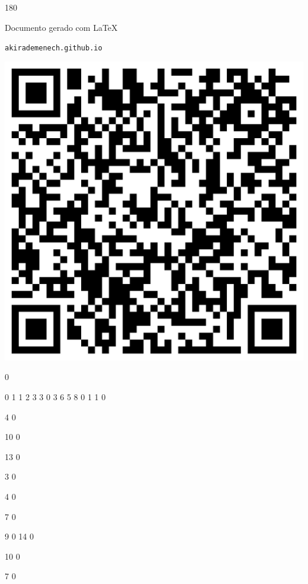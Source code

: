 \documentclass[12pt]{article}
\begin{document}
	\begin{turn}{180}	
		\begin{minipage}{\textwidth}		  
		  Documento gerado com \LaTeX			
		  
		  \texttt{akirademenech.github.io}

		  \includegraphics[height=0.3\textheight]{2e-2.pdf}

		\end{minipage}	
	\end{turn}  
		  
		\vfill  
		  
{
	0	%

	0	%
	1	%
	1	%
	2	%
	3	%
	3	%
	0	%
	3	%
	6	%
	5	%
	8	%
	0	%
	1	%
	1	%
	0	%

	4	%
	0	%

	10	%
	0	%

	13	%
	0	%

	3	%
	0	%

	4	%
	0	%

	7	%
	0	%

	9	%
	0	%
	14	%
	0	%

	10	%
	0	%

	7	%
	0	%

}	  
		    	
\end{document}
